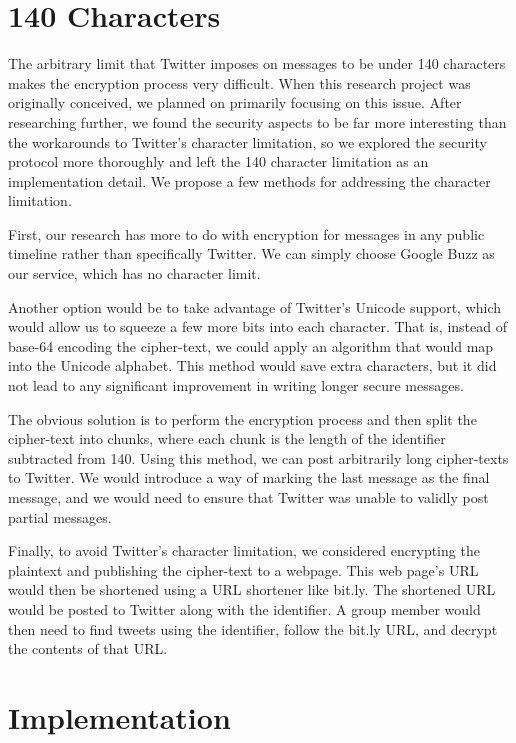 \documentclass{article}
\begin{document}
\section*{140 Characters}

The arbitrary limit that Twitter imposes on messages to be under 140 characters makes the encryption process very difficult. When this research project was originally conceived, we planned on primarily focusing on this issue. After researching further, we found the security aspects to be far more interesting than the workarounds to Twitter's character limitation, so we explored the security protocol more thoroughly and left the 140 character limitation as an implementation detail. We propose a few methods for addressing the character limitation.

First, our research has more to do with encryption for messages in any public timeline rather than specifically Twitter. We can simply choose Google Buzz as our service, which has no character limit. 

Another option would be to take advantage of Twitter's Unicode support, which would allow us to squeeze a few more bits into each character. That is, instead of base-64 encoding the cipher-text, we could apply an algorithm that would map into the Unicode alphabet. This method would save extra characters, but it did not lead to any significant improvement in writing longer secure messages.

The obvious solution is to perform the encryption process and then split the cipher-text into chunks, where each chunk is the length of the identifier subtracted from 140. Using this method, we can post arbitrarily long cipher-texts to Twitter. We would introduce a way of marking the last message as the final message, and we would need to ensure that Twitter was unable to validly post partial messages.

Finally, to avoid Twitter's character limitation, we considered encrypting the plaintext and publishing the cipher-text to a webpage. This web page's URL would then be shortened using a URL shortener like bit.ly. The shortened URL would be posted to Twitter along with the identifier. A group member would then need to find tweets using the identifier, follow the bit.ly URL, and decrypt the contents of that URL. 



\section*{Implementation}
\end{document}
